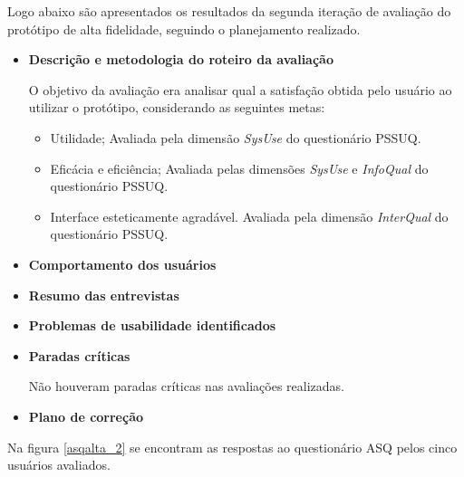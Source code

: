   Logo abaixo são apresentados os resultados da segunda iteração de avaliação do protótipo de alta fidelidade,
  seguindo o planejamento realizado.
  
  \begin{itemize}
    \item \textbf{Descrição e metodologia do roteiro da avaliação}
    
    \subitem O objetivo da avaliação era analisar qual a satisfação obtida pelo usuário ao utilizar o protótipo, 
    considerando as seguintes metas:
    
    \begin{itemize}
      \item Utilidade;
	\subitem Avaliada pela dimensão \textit{SysUse} do questionário PSSUQ.
	
      \item Eficácia e eficiência;
	\subitem Avaliada pelas dimensões \textit{SysUse} e \textit{InfoQual} do questionário PSSUQ.
	
      \item Interface esteticamente agradável.
	\subitem Avaliada pela dimensão \textit{InterQual} do questionário PSSUQ.
    \end{itemize}
    
    \item \textbf{Comportamento dos usuários}
    
      \subitem 
    
    \item \textbf{Resumo das entrevistas}
    
      \subitem 
	    
    \item \textbf{Problemas de usabilidade identificados}
    
      \subitem 
          
    \item \textbf{Paradas críticas}
    
      \subitem Não houveram paradas críticas nas avaliações realizadas.
    
    \item \textbf{Plano de correção}
    
      \subitem 
    
  \end{itemize}
  
  Na figura \ref{asqalta_2} se encontram as respostas ao questionário ASQ pelos cinco usuários avaliados.
  
%   
%   
